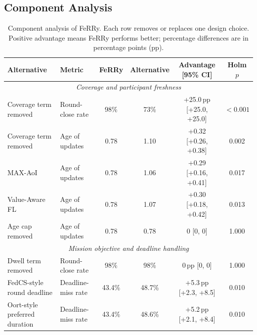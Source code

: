 \documentclass[conference]{IEEEtran}
\newcommand{\sysname}{FeRRy}
\begin{document}



\appendix
\label{app:evaluation}

\subsection{Component Analysis}
\label{app:components}

\begin{table}[h]
\centering
\caption{Component analysis of \sysname{}. Each row removes or replaces one
design choice. Positive advantage means
\sysname{} performs better; percentage differences are in percentage points
(pp).}
\label{tab:component-analysis}
\small
\begin{tabular}{
p{}
p{}
c
c
c
c
}
\hline
\textbf{Alternative} &
\textbf{Metric} &
\textbf{\sysname{}} &
\textbf{Alternative} &
\textbf{Advantage [95\% CI]} &
\textbf{Holm $p$} \\
\hline

\multicolumn{6}{c}{\textit{Coverage and participant freshness}} \\
\hline

Coverage term removed &
Round-close rate &
98\% & 73\% &
+25.0\,pp [+25.0, +25.0] &
$<0.001$ \\

Coverage term removed &
Age of updates &
0.78 & 1.10 &
+0.32 [+0.26, +0.38] &
0.002 \\

MAX-AoI &
Age of updates &
0.78 & 1.06 &
+0.29 [+0.16, +0.41] &
0.017 \\

Value-Aware FL &
Age of updates &
0.78 & 1.07 &
+0.30 [+0.18, +0.42] &
0.013 \\

Age cap removed &
Age of updates &
0.78 & 0.78 &
0 [0, 0] &
1.000 \\

\hline
\multicolumn{6}{c}{\textit{Mission objective and deadline handling}} \\
\hline

Dwell term removed &
Round-close rate &
98\% & 98\% &
0\,pp [0, 0] &
1.000 \\

FedCS-style round deadline &
Deadline-miss rate &
43.4\% & 48.7\% &
+5.3\,pp [+2.3, +8.5] &
0.010 \\

Oort-style preferred duration &
Deadline-miss rate &
43.4\% & 48.6\% &
+5.2\,pp [+2.1, +8.4] &
0.010 \\


\end{tabular}
\end{table}
\end{document}
